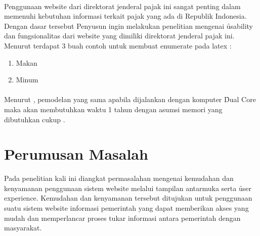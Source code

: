 \newline\\
Penggunaan website dari direktorat jenderal pajak ini sangat penting dalam memenuhi kebutuhan informasi terkait pajak yang ada di Republik Indonesia. Dengan dasar tersebut Penyusun ingin melakukan penelitian mengenai \f{usability} dan fungsionalitas dari website yang dimiliki direktorat jenderal pajak ini.
\newline\\
Menurut \citeauthor{book.buyya} terdapat 3 buah contoh untuk membuat enumerate pada latex \citep{book.buyya}: 
\begin{enumerate}
\item Makan
\item Minum
\end{enumerate}\paragraph{}

Menurut \cite{ppt.ecmwf}, pemodelan yang sama apabila dijalankan dengan komputer \f{Dual Core} maka akan membutuhkan waktu 1 tahun dengan asumsi memori yang dibutuhkan cukup \citep{ppt.ecmwf}.

\section{Perumusan Masalah}
Pada penelitian kali ini diangkat permasalahan mengenai kemudahan dan kenyamanan penggunaan sistem website melalui tampilan antarmuka serta \f{user experience}. Kemudahan dan kenyamanan tersebut ditujukan untuk penggunaan suatu sistem website informasi pemerintah yang dapat memberikan akses yang mudah dan memperlancar proses tukar informasi antara pemerintah dengan masyarakat.


